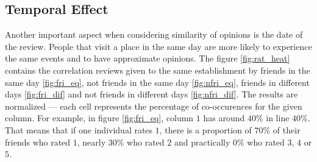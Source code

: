 \subsection{Temporal Effect}
Another important aspect when considering similarity of opinions is the date of
the review. People that visit a place in the same day are more likely to
experience the same events and to have approximate opinions. The figure
\ref{fig:rat_heat} contains the correlation reviews given to the same
establishment by friends in the same day \ref{fig:fri_eq}, not friends in the
same day \ref{fig:nfri_eq}, friends in different days \ref{fig:fri_dif} and not
friends in different days \ref{fig:nfri_dif}. The results are normalized ---
each cell represents the percentage of co-occurences for the given column. For
example, in figure \ref{fig:fri_eq}, column $1$ has around $40$\% in line
$40$\%. That means that if one individual rates $1$, there is a proportion of
$70$\% of their friends who rated $1$, nearly $30$\% who rated $2$ and
practically $0$\% who rated $3$, $4$ or $5$.


